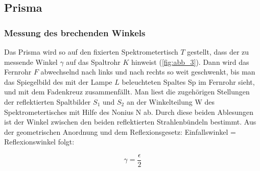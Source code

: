 \documentclass[11pt,ngerman]{scrartcl}
\begin{document}
\newpage

\subsection{Prisma}

\subsubsection{Messung des brechenden Winkels}

Das Prisma wird so auf den fixierten Spektrometertisch $T$ gestellt, dass der zu messende Winkel
$\gamma$ auf das Spaltrohr $K$ hinweist (\autoref{fig:abb_3}). Dann wird das Fernrohr $F$ abwechselnd nach links
und nach rechts so weit geschwenkt, bis man das Spiegelbild des mit der Lampe $L$ beleuchteten
Spaltes Sp im Fernrohr sieht, und mit dem Fadenkreuz zusammenfällt. Man liest die zugehörigen
Stellungen der reflektierten Spaltbilder $S_1$ und $S_2$ an der Winkelteilung W des Spektrometertisches
mit Hilfe des Nonius N ab. Durch diese beiden Ablesungen ist der Winkel zwischen den
beiden reflektierten Strahlenbündeln bestimmt. Aus der geometrischen Anordnung und dem
Reflexionsgesetz: Einfallswinkel = Reflexionswinkel folgt:

\begin{equation}
	\gamma = \frac{\epsilon}{2}
	\label{eq:gamma}
\end{equation}
\end{document}
